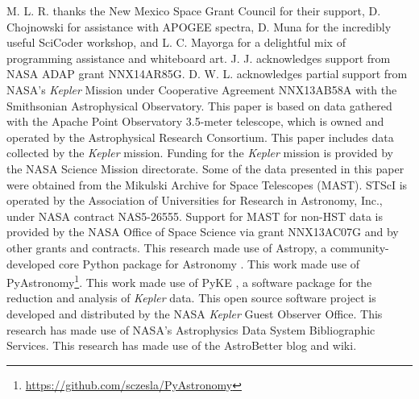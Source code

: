 \acknowledgments
M. L. R. thanks the New Mexico Space Grant Council for their support, D. Chojnowski for assistance with APOGEE spectra, D. Muna for the incredibly useful SciCoder workshop, and L. C. Mayorga for a delightful mix of programming assistance and whiteboard art. J. J. acknowledges support from NASA ADAP grant NNX14AR85G. D. W. L. acknowledges partial support from NASA's \emph{Kepler} Mission under Cooperative Agreement NNX13AB58A with the Smithsonian Astrophysical Observatory. This paper is based on data gathered with the Apache Point Observatory 3.5-meter telescope, which is owned and operated by the Astrophysical Research Consortium. This paper includes data collected by the \emph{Kepler} mission. Funding for the \emph{Kepler} mission is provided by the NASA Science Mission directorate. Some of the data presented in this paper were obtained from the Mikulski Archive for Space Telescopes (MAST). STScI is operated by the Association of Universities for Research in Astronomy, Inc., under NASA contract NAS5-26555. Support for MAST for non-HST data is provided by the NASA Office of Space Science via grant NNX13AC07G and by other grants and contracts. This research made use of Astropy, a community-developed core Python package for Astronomy \citep{astropy}. This work made use of PyAstronomy\footnote{\url{https://github.com/sczesla/PyAstronomy}}. This work made use of PyKE \citep{pyke}, a software package for the reduction and analysis of \emph{Kepler} data. This open source software project is developed and distributed by the NASA \emph{Kepler} Guest Observer Office. This research has made use of NASA's Astrophysics Data System Bibliographic Services. This research has made use of the AstroBetter blog and wiki.

  
  